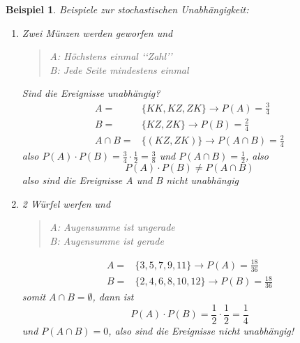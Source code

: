 \documentclass{report}
\newtheorem{myexample}{Beispiel}
\begin{document}
\begin{myexample}Beispiele zur stochastischen Unabhängigkeit:
\begin{enumerate}
\item
Zwei Münzen werden geworfen und
\begin{quote}
A: Höchstens einmal \lq\lq{}Zahl\rq\rq{}\\
B: Jede Seite mindestens einmal
\end{quote}
Sind die Ereignisse unabhängig?
\begin{align*}
 A =& \{KK, KZ, ZK\} \longrightarrow P(A) = \frac{3}{4}\\
 B =& \{KZ, ZK\} \longrightarrow P(B) = \frac{2}{4}\\
A \cap B =& \{(KZ, ZK)\} \longrightarrow P(A \cap B) = \frac{2}{4}
\end{align*}
also $P(A) \cdot P(B) = \frac{3}{4} \cdot \frac{1}{2} = \frac{3}{8}$ und $P(A \cap B) = \frac{1}{2}$, also
\begin{equation}
P(A) \cdot P(B) \neq P(A \cap B)
\end{equation}
also sind die Ereignisse A  und B nicht unabhängig
\item
2 Würfel werfen und
\begin{quote}
A: Augensumme ist ungerade\\
B: Augensumme ist gerade
\end{quote}
\begin{align*}
 A =& \{3,5,7,9,11\} \longrightarrow P(A) = \frac{18}{36}\\
 B =& \{2,4,6,8,10,12\} \longrightarrow P(B) = \frac{18}{36}
\end{align*}
somit $A \cap B = \emptyset$, dann ist
\begin{equation}
P(A) \cdot P(B) = \frac{1}{2} \cdot \frac{1}{2} = \frac{1}{4}
\end{equation}
und $P(A \cap B) = 0$, also sind die Ereignisse nicht unabhängig!
\end{enumerate}
\end{myexample}
\end{document}
